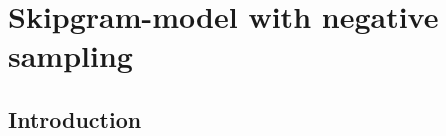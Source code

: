 \documentclass[12pt,a4paper,twoside]{book}
\begin{document}
\setlength{\parindent}{2em}

\iffalse
\begingroup
  \pagenumbering{roman}
  

\newpage

\thispagestyle{empty}

\rule{0cm}{5cm}

\newpage

\thispagestyle{empty}






\newpage

\endgroup


\pagestyle{fancy}

\renewcommand{\sectionmark}[1]{\markright{\thesection\ #1}}
\renewcommand{\chaptermark}[1]{\markboth{\thechapter\ #1}{}}
\lhead[\rm\thepage]{\sl\rightmark}
\chead{}
\rhead[\sl\leftmark]{\rm\thepage}

\lfoot{}
\cfoot{}
\rfoot{}


\tableofcontents


\fi



%

%

%

%

%

%

% 

%

\section{Skipgram-model with negative sampling}
\subsection{Introduction}
\end{document}
